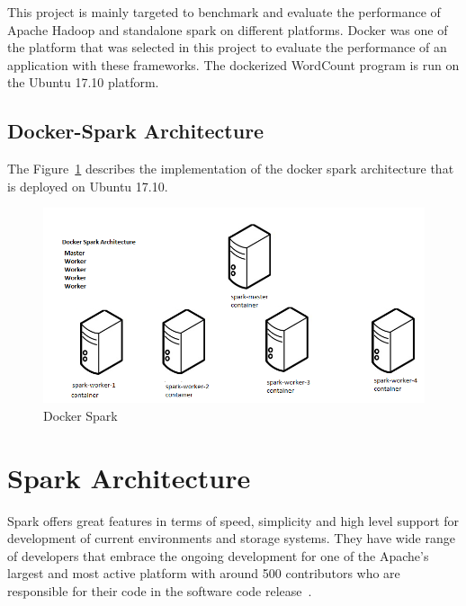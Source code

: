 This project is mainly targeted to benchmark and evaluate the performance of 
Apache Hadoop and standalone spark on different platforms. Docker was one of the
platform that was selected in this project to evaluate the performance of an 
application with these frameworks. The dockerized WordCount program is run on 
the Ubuntu 17.10 platform.  

\subsection{Docker-Spark Architecture} 
The Figure~\ref{s:archidocker} describes the implementation of 
the docker spark architecture that is deployed on Ubuntu 17.10.

\begin{figure}[!ht]
\centering\includegraphics[width=\textwidth]{images/dockerspark.png}
\caption{Docker Spark}\label{sa:archidocker}\label{s:archidocker}
\end{figure}

\section{Spark Architecture}

Spark offers great features in terms of speed, simplicity and high level support
 for development of current environments and storage systems. They have wide 
 range of developers that embrace the ongoing development for one of the 
 Apache's largest and most active platform with around 500 contributors who are 
 responsible for their code in the 
 software code release~\cite{hid-sp18-410-spark-architecture}.

